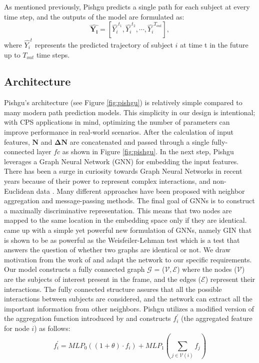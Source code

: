 \documentclass[sigconf]{acmart}
\begin{document}
As mentioned previously, Pishgu predicts a single path for each subject at every time step, and the outputs of the model are formulated as:
\begin{equation}
\label{eq:output}
    \boldsymbol{\hat{Y_{i}}}=\left[
        \hat{Y_{i}}^{t_{1}},\hat{Y_{i}}^{t_{2}}, \cdots, \hat{Y_{i}}^{T_{out}}
    \right],
\end{equation}
where $ \hat{Y_{i}}^{t}$ represents the predicted trajectory of subject $i$ at time t in the future up to $T_{out}$ time steps.

\subsection{Architecture}

Pishgu's architecture (see Figure \ref{fig:pishgu}) is relatively simple compared to many modern path prediction models. This simplicity in our design is intentional; with CPS applications in mind, optimizing the number of parameters can improve performance in real-world scenarios. After the calculation of input features, $\boldsymbol{N}$ and $\boldsymbol{\Delta N}$ are concatenated and passed through a single fully-connected layer $fc$ as shown in Figure \ref{fig:pishgu}. In the next step, Pishgu leverages a Graph Neural Network (GNN) for embedding the input features. There has been a surge in curiosity towards Graph Neural Networks in recent years because of their power to represent complex interactions, and non-Euclidean data \cite{xu2018powerful,velivckovic2017graph, kipf2016semi}. Many different approaches have been proposed with neighbor aggregation and message-passing methods. The final goal of GNNs is to construct a maximally discriminative representation. This means that two nodes are mapped to the same location in the embedding space only if they are identical. \cite{xu2018powerful} came up with a simple yet powerful new formulation of GNNs, namely GIN that is shown to be as powerful as the Weisfeiler-Lehman test \cite{leman1968reduction} which is a test that answers the question of whether two graphs are identical or not. We draw motivation from the work of \cite{xu2018powerful} and adapt the network to our specific requirements. Our model constructs a fully connected graph $\mathcal{G}$ = ($\mathcal{V}, \mathcal{E}$) where the nodes ($\mathcal{V}$) are the subjects of interest present in the frame, and the edges ($\mathcal{E}$) represent their interactions. The fully connected structure assures that all the possible interactions between subjects are considered, and the network can extract all the important information from other neighbors. Pishgu utilizes a modified version of the aggregation function introduced by \cite{xu2018powerful} and constructs $f_{i}^{\prime}$ (the aggregated feature for node $i$) as follows:
\begin{equation}
f_{i}^{\prime}=MLP_{0}\left((1+\theta) \cdot f_{i}\right)+ MLP_{1}\left(\sum_{j\in \mathcal{V}(i)} f_{j}\right)
\label{eq:GIN}
\end{equation}
\end{document}
